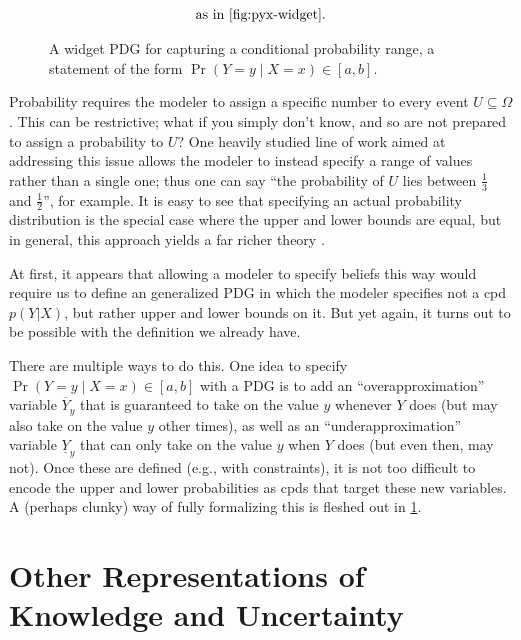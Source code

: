 \begin{figure}
\begin{align*}
            \text{as in \cref{fig:pyx-widget}.}
        \end{align*}
    \caption{A widget PDG for capturing a conditional probability range, a statement of the form $\Pr(Y{=}y\mid X{=}x) \in [a,b]$.}
    \label{fig:pyx-range-widget}
\end{figure}

Probability requires the modeler to assign a specific number to every event $U \subseteq \Omega$. This can be restrictive; what if you simply don't know, and so are not prepared to assign a probability to $U$? 
One heavily studied line of work aimed at addressing this issue allows the modeler to instead specify a range of values rather than a single one; thus one can say ``the probability of $U$ lies between $\frac13$ and $\frac12$'', for example.
It is easy to see that specifying an actual probability distribution is the special case where the upper and lower bounds are equal, but in general, this approach yields a far richer theory \citep{Walley1991-SRIP}.

At first, it appears that allowing a modeler to specify beliefs this way would require us to define an generalized PDG in which the modeler specifies not a cpd $p(Y|X)$, but rather upper and lower bounds on it. But yet again, it turns out to be possible with the definition we already have.

There are multiple ways to do this. One idea to specify $\Pr(Y{=}y\mid X{=}x) \in [a,b]$ with a PDG is to add an ``overapproximation'' variable $\overline Y_y$ that is guaranteed to take on the value $y$ whenever $Y$ does (but may also take on the value $y$ other times), as well as an ``underapproximation'' variable $\underline Y_y$ that can only take on the value $y$ when $Y$ does (but even then, may not). 
Once these are defined (e.g., with constraints), it is not too difficult to encode the upper and lower probabilities as cpds that target these new variables. 
A (perhaps clunky) way of fully formalizing this is fleshed out in \cref{fig:pyx-range-widget}.

\section{Other Representations of Knowledge and Uncertainty}
    \label{sec:other-uncertainty-repr}

